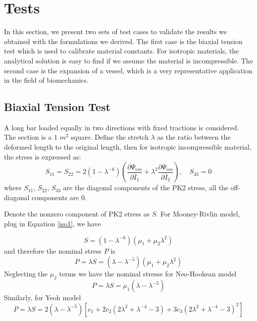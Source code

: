 \section{Tests}
In this section, we present two sets of test cases to validate the results we obtained with the formulations we derived. The first case is the biaxial tension test which is used to calibrate material constants. For isotropic materials, the analytical solution is easy to find if we assume the material is incompressible. The second case is the expansion of a vessel, which is a very representative application in the field of biomechanics.  

\subsection{Biaxial Tension Test}
\label{biaxial_tension_test}
A long bar loaded equally in two directions with fixed tractions is considered. The section is a $1$ $m^2$ square. Define the stretch $\lambda$ as the ratio between the deformed length to the original length, then for isotropic incompressible material, the stress is expressed as:
\begin{equation}
S_{11} = S_{22} = 2(1 - {\lambda}^{-6})(\frac{\partial\Psi_{iso}}{\partial\bar{I}_1} + {\lambda}^2\frac{\partial\Psi_{iso}}{\partial\bar{I}_2}), \quad S_{33} = 0
\end{equation}
where $S_{11}$, $S_{22}$, $S_{33}$ are the diagonal components of the PK2 stress, all the off-diagonal components are $0$.

Denote the nonzero component of PK2 stress as $S$. For Mooney-Rivlin model, plug in Equation \ref{iso1}, we have

\begin{equation}
S = (1 - {\lambda}^{-6})(\mu_1 + \mu_2{\lambda}^2)
\end{equation}
and therefore the nominal stress $P$ is
\begin{equation}
P = \lambda S =  (\lambda - {\lambda}^{-5})(\mu_1 + \mu_2{\lambda}^2)
\end{equation}
Neglecting the $\mu_2$ terms we have the nominal stresse for Neo-Hookean model
\begin{equation}
P = \lambda S =  \mu_1(\lambda - {\lambda}^{-5})
\end{equation}
Similarly, for Yeoh model
\begin{equation}
P = \lambda S = 2(\lambda - {\lambda}^{-5})[c_1 + 2c_2(2{\lambda}^2 + {\lambda}^{-4} - 3) + 3c_3(2{\lambda}^2 + {\lambda}^{-4} - 3)^2]
\end{equation}

